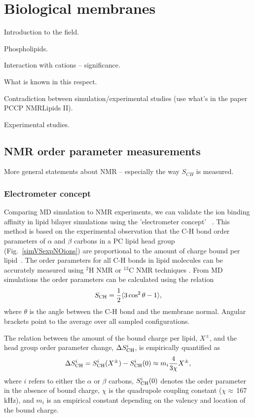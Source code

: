 \chapter{Biological membranes}

 Introduction to the field. 
 \cite{Student08}

 Phospholipids. 

 Interaction with cations -- significance. 

 What is known in this respect. 

 Contradiction between simulation/experimental studies 
(use what's in the paper PCCP NMRLipids II). 

Experimental studies. 

\section{NMR order parameter measurements}
 
  More general statements about NMR  -- especially the way $S_{CH}$ is measured. 

\subsection{Electrometer concept} \label{section:electrometer} 

Comparing MD simulation to NMR experiments, we can validate the ion 
binding affinity in lipid bilayer simulations using the 'electrometer concept'~ \cite{seelig87, catte16}. 
This method is based on the experimental observation that the C-H bond order parameters of $\alpha$ and $\beta$ carbons in a PC lipid head group (Fig.~\ref{simVSexpNOions}) are proportional to the amount of charge bound per lipid~\cite{seelig87}. 
The order parameters for all C-H bonds in lipid molecules can be accurately measured using $^2$H NMR or $^{13}$C NMR techniques \cite{ollila16}. 
From MD simulations the order parameters can be calculated using the relation 
\begin{equation}\label{OP} 
S_{\rm CH}=\frac{1}{2}\langle 3\cos^2\theta -1 \rangle, 
\end{equation} 
where $\theta$ is the angle between the C-H bond and the membrane normal. 
Angular brackets point to the average over all sampled configurations. 
 
The relation between the amount of the bound charge per lipid, $X^\pm$, and the head group order parameter change, $\Delta S_{\rm{CH}}^{i}$, is empirically quantified as~\cite{seelig87,ferreira16} 
\begin{equation}\label{OPchangeEQ} 
\Delta S_{\rm{CH}}^{i}= S_{\rm{CH}}^{i}(X^\pm)-S_{\rm{CH}}^{i}(0) \approx m_i \frac{4 }{3\chi}X^\pm, 
\end{equation} 
where $i$ refers to either the $\alpha$ or $\beta$ carbons, $S_{\rm{CH}}^{i}(0)$ denotes the order parameter in the absence of bound charge, $\chi$ is the quadrupole coupling constant ($\chi \approx$\,167\,kHz), and $m_i$ is an empirical constant depending on the valency and location of the bound charge. 
 

